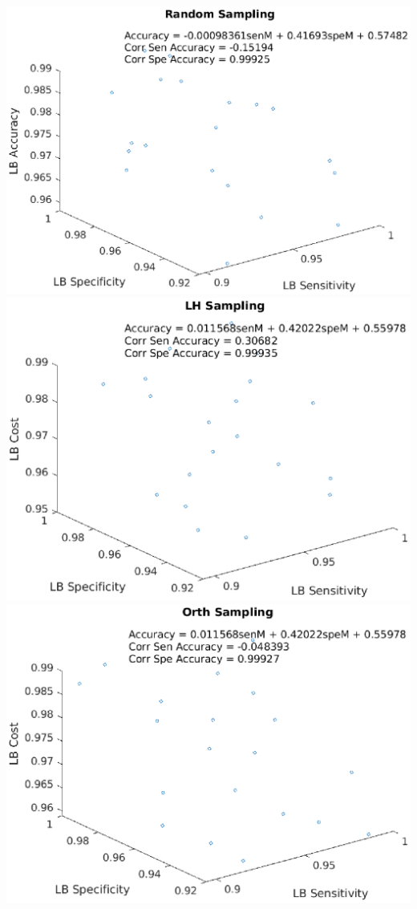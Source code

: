 \documentclass[aspectratio=1610]{beamer}
\begin{document}
\begin{frame}
\includegraphics[scale = .3]{lb4}
\includegraphics[scale = .3]{lb5}
\includegraphics[scale = .3]{lb6}
\end{frame}
\end{document}
